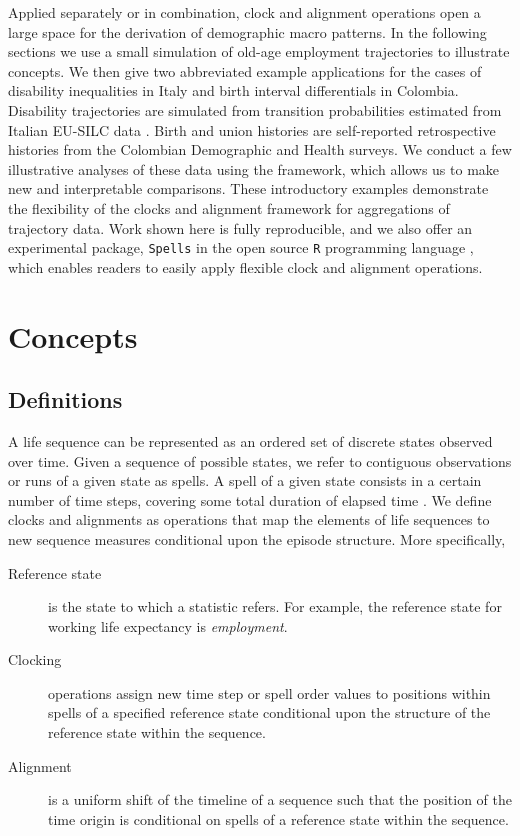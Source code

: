 \documentclass[a4paper,left=1.25cm,right=1.25cm,top=1.25cm,bottom=1.25cm]{article}
\begin{document}
Applied separately or in combination, clock and alignment operations open a large space for the derivation of demographic macro patterns. In the following sections we use a small simulation of old-age employment trajectories to illustrate concepts. We then give two abbreviated example applications for the cases of disability inequalities in Italy and birth interval differentials in Colombia. Disability trajectories are simulated from transition probabilities estimated from Italian EU-SILC data \citep{SILC}. Birth and union histories are self-reported retrospective histories from the Colombian Demographic and Health surveys. We conduct a few illustrative analyses of these data using the framework, which allows us to make new and interpretable comparisons. These introductory examples demonstrate the flexibility of the clocks and alignment framework for aggregations of trajectory data. Work shown here is fully reproducible, and we also offer an experimental package, \texttt{Spells} in the open source \texttt{R} programming language \citep{r2020}, which enables readers to easily apply flexible clock and alignment operations.

\section{Concepts}

\subsection{Definitions}

A life sequence can be represented as an ordered set of discrete states observed over time. Given a sequence of possible states, we refer to contiguous observations or runs of a given state as spells. A spell of a given state consists in a certain number of time steps, covering some total duration of elapsed time \citep{cornwell2015}. We define clocks and alignments as operations that map the elements of life sequences to new sequence measures conditional upon the episode structure. More specifically,

\begin{description}
    \item[Reference state] is the state to which a statistic refers. For example, the reference state for working life expectancy is \emph{employment}.
    \item[Clocking] operations assign new time step or spell order values to positions within spells of a specified reference state conditional upon the structure of the reference state within the sequence.  
    \item[Alignment] is a uniform shift of the timeline of a sequence such that the position of the time origin is conditional on spells of a reference state within the sequence. 
\end{description}
\end{document}
